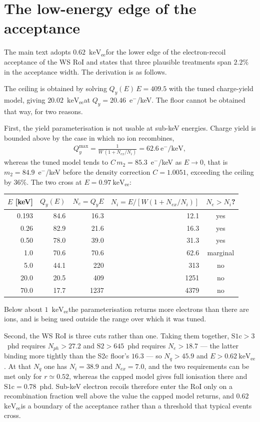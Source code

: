 \documentclass[11pt,a4paper]{article}
\newcommand{\keVee}{\ensuremath{\mathrm{keV_{ee}}}}
\begin{document}
\section{The low-energy edge of the acceptance}
\label{sup:floor}

The main text adopts \(0.62\)~\keVee for the lower edge of the
electron-recoil acceptance of the WS RoI and states that three plausible
treatments span \(2.2\%\) in the acceptance width. The derivation is as
follows.

The ceiling is obtained by solving \(Q_y(E)\,E=409.5\) with the tuned
charge-yield model, giving \(20.02\)~\keVee at
\(Q_y=20.46\)~e\(^-\)/keV. The floor cannot be obtained that way, for two
reasons.

First, the yield parameterisation is not usable at sub-keV energies.
Charge yield is bounded above by the case in which no ion recombines,
\begin{align}
    \label{eq:qymax}
    Q_y^{\max}=\frac{1}{W\,(1+N_{ex}/N_i)}=62.6~\mathrm{e^-/keV},
\end{align}
whereas the tuned model tends to \(C\,m_2=85.3\)~e\(^-\)/keV as
\(E\to0\), that is \(m_2=84.9\)~e\(^-\)/keV before the density correction
\(C=1.0051\), exceeding the ceiling by \(36\%\). The two cross at
\(E=0.97~\mathrm{keV_{ee}}\):

\begin{center}
\begin{tabular}{rrrrc}
\toprule
\(E\) [keV] & \(Q_y(E)\) & \(N_e=Q_yE\) & \(N_i=E/[W(1+N_{ex}/N_i)]\) & \(N_e>N_i\)?\\
\midrule
0.193 & 84.6 &  16.3 &   12.1 & yes\\
0.26  & 82.9 &  21.6 &   16.3 & yes\\
0.50  & 78.0 &  39.0 &   31.3 & yes\\
1.0   & 70.6 &  70.6 &   62.6 & marginal\\
5.0   & 44.1 & 220   &  313   & no\\
20.0  & 20.5 & 409   & 1251   & no\\
70.0  & 17.7 & 1237  & 4379   & no\\
\bottomrule
\end{tabular}
\end{center}

\noindent Below about \(1\)~\keVee the parameterisation returns more
electrons than there are ions, and is being used outside the range over
which it was tuned.

Second, the WS RoI is three cuts rather than one. Taking them together,
\(\mathrm{S1c}>3\)~phd requires \(N_{ph}>27.2\) and
\(\mathrm{S2}>645\)~phd requires \(N_e>18.7\) --- the latter binding more
tightly than the S2c floor's \(16.3\) --- so \(N_q>45.9\) and
\(E>0.62~\mathrm{keV_{ee}}\). At that \(N_q\) one has \(N_i=38.9\) and
\(N_{ex}=7.0\), and the two requirements can be met only for
\(r\simeq0.52\), whereas the capped model gives full ionisation there and
\(\mathrm{S1c}=0.78\)~phd. Sub-keV electron recoils therefore enter the
RoI only on a recombination fraction well above the value the capped model
returns, and \(0.62\)~\keVee is a boundary of the acceptance rather
than a threshold that typical events cross.
\end{document}
